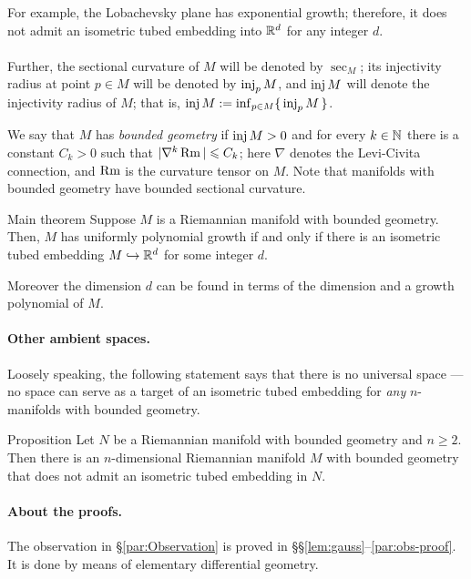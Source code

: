 \documentclass[a4paper,10pt]{article}
\begin{document}
For example,
the Lobachevsky plane has exponential growth;
therefore, it does not admit an isometric tubed embedding into $\mathbb{R}^d$ for any integer $d$.




\paragraph{}\label{par:main} 
Further, the sectional curvature of $M$ will be denoted by $\sec_M$;
its injectivity radius at point $p\in M$ will be denoted by $\operatorname{\rm inj}_pM$, and $\operatorname{\rm inj} M$ will denote the injectivity radius of $M$; that is, $\operatorname{\rm inj} M\mathrel{{:}{=}} \inf_{p\in M}\{\,\operatorname{\rm inj}_pM\,\}$.

We say that $M$ has \emph{bounded geometry} if $\operatorname{\rm inj} M>0$ and for every $k\in\mathbb{N}$ there is a constant $C_k > 0$ such that $|\nabla^k \operatorname{\rm Rm}| \leqslant C_k$;
here $\nabla$ denotes the Levi-Civita connection, and $\operatorname{\rm Rm}$ is the curvature tensor on $M$.
Note that manifolds with bounded geometry have bounded sectional curvature.

\begin{thm}{Main theorem}
Suppose $M$ is a Riemannian manifold with bounded geometry.
Then, $M$ has uniformly  polynomial growth
if and only if there is an isometric tubed embedding $M \hookrightarrow \mathbb{R}^d$ for some integer $d$.

Moreover the dimension $d$ can be found in terms of the dimension and a growth polynomial of $M$.
\end{thm}

\paragraph{Other ambient spaces.}\label{par:other-intro}
Loosely speaking, the following statement says that there is no universal space --- no space can serve as a target of an isometric tubed embedding for \textit{any} $n$-manifolds with bounded geometry.

\begin{thm}{Proposition}
Let $N$ be a Riemannian manifold with bounded geometry and $n\ge 2$.
Then there is an $n$-dimensional  Riemannian manifold $M$ with bounded geometry that does not admit an isometric tubed embedding in $N$.
\end{thm}

\paragraph{About the proofs.}
The observation in §\ref{par:Observation} is proved in §§\ref{lem:gauss}--\ref{par:obs-proof}.
It is done by means of elementary differential geometry.
\end{document}
